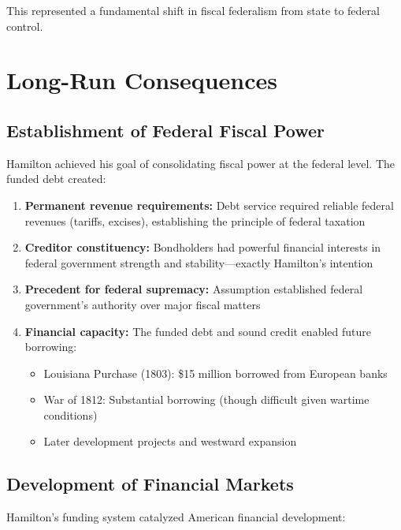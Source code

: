 \documentclass[12pt]{article}
\begin{document}
This represented a fundamental shift in fiscal federalism from state to federal control.

\section{Long-Run Consequences}\label{sec:consequences}

\subsection{Establishment of Federal Fiscal Power}

Hamilton achieved his goal of consolidating fiscal power at the federal level. The funded debt created:

\begin{enumerate}
\item \textbf{Permanent revenue requirements:} Debt service required reliable federal revenues (tariffs, excises), establishing the principle of federal taxation

\item \textbf{Creditor constituency:} Bondholders had powerful financial interests in federal government strength and stability---exactly Hamilton's intention

\item \textbf{Precedent for federal supremacy:} Assumption established federal government's authority over major fiscal matters

\item \textbf{Financial capacity:} The funded debt and sound credit enabled future borrowing:
\begin{itemize}
\item Louisiana Purchase (1803): \$15 million borrowed from European banks
\item War of 1812: Substantial borrowing (though difficult given wartime conditions)
\item Later development projects and westward expansion
\end{itemize}
\end{enumerate}

\subsection{Development of Financial Markets}

Hamilton's funding system catalyzed American financial development:
\end{document}
